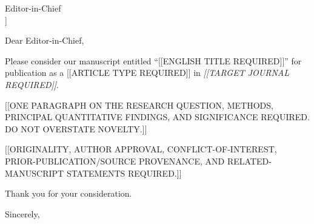 \documentclass[11pt]{letter}
\begin{document}
\begin{letter}{Editor-in-Chief\\[[TARGET JOURNAL REQUIRED]]}
\opening{Dear Editor-in-Chief,}

Please consider our manuscript entitled ``[[ENGLISH TITLE REQUIRED]]'' for publication as a [[ARTICLE TYPE REQUIRED]] in \emph{[[TARGET JOURNAL REQUIRED]]}.

[[ONE PARAGRAPH ON THE RESEARCH QUESTION, METHODS, PRINCIPAL QUANTITATIVE FINDINGS, AND SIGNIFICANCE REQUIRED. DO NOT OVERSTATE NOVELTY.]]

[[ORIGINALITY, AUTHOR APPROVAL, CONFLICT-OF-INTEREST, PRIOR-PUBLICATION/SOURCE PROVENANCE, AND RELATED-MANUSCRIPT STATEMENTS REQUIRED.]]

Thank you for your consideration.

\closing{Sincerely,}
\end{letter}
\end{document}
